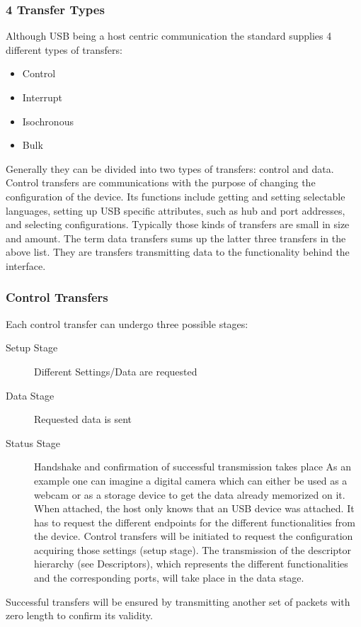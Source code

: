 \subsubsection{ 4 Transfer Types}
Although USB being a host centric communication the standard supplies 4 different types of transfers: 
\begin{itemize}
 \item Control
 \item Interrupt
 \item Isochronous
 \item Bulk
\end{itemize}

Generally they can be divided into two types of transfers: control and data. Control transfers are communications with the purpose of changing the 
configuration of the device. Its functions include getting and setting selectable languages, setting up USB specific attributes, such as hub and port 
addresses, and selecting configurations. Typically those kinds of transfers are small in size and amount. 
The term data transfers sums up the latter three transfers in the above list. They are transfers transmitting data to the functionality 
behind the interface. 

\subsubsection*{Control Transfers}
Each control transfer can undergo three possible stages: 
\begin{description}
 \item[Setup Stage]Different Settings/Data are requested
 \item[Data Stage] Requested data is sent
 \item[Status Stage] Handshake and confirmation of successful transmission takes place
As an example one can imagine a digital camera which can either be used as a webcam or as a storage device to get the data already memorized on it.
When attached, the host only knows that an USB device was attached. It has to request the different endpoints for the different functionalities from 
the device. Control transfers will be initiated to request the configuration acquiring those settings (setup stage). The transmission of the
descriptor hierarchy (see Descriptors), which represents the different functionalities and the corresponding ports, will take place in the data 
stage.
\end{description}
Successful transfers will be ensured by transmitting another set of packets with zero length to confirm its validity.

